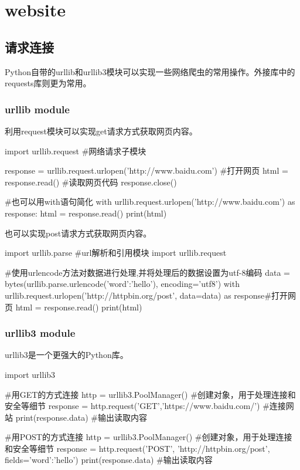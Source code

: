 \section{website}

  \subsection{请求连接}
    Python自带的urllib和urllib3模块可以实现一些网络爬虫的常用操作。外接库中的requests库则更为常用。
    \subsubsection{urllib module}
      利用request模块可以实现get请求方式获取网页内容。
      \begin{codeblock}[language=python, caption={Fetch web content using GET method}]
        import urllib.request #网络请求子模块

        response = urllib.request.urlopen('http://www.baidu.com') #打开网页
        html = response.read() #读取网页代码
        response.close()

        #也可以用with语句简化
        with urllib.request.urlopen('http://www.baidu.com') as response:
            html = response.read()
        print(html)
      \end{codeblock}

      也可以实现post请求方式获取网页内容。
      \begin{codeblock}[language=python, caption={Fetch web content using POST method}]
        import urllib.parse #url解析和引用模块
        import urllib.request

        #使用urlencode方法对数据进行处理,并将处理后的数据设置为utf-8编码
        data = bytes(urllib.parse.urlencode({'word':'hello'}), encoding='utf8')
        with urllib.request.urlopen('http://httpbin.org/post', data=data) as response#打开网页
            html = response.read()
        print(html)
      \end{codeblock}

    \subsubsection{urllib3 module}
      urllib3是一个更强大的Python库。
      \begin{codeblock}[language=python, caption={urllib3 module}]
        import urllib3

        #用GET的方式连接
        http = urllib3.PoolManager() #创建对象，用于处理连接和安全等细节
        response = http.request('GET','https://www.baidu.com/') #连接网站
        print(response.data) #输出读取内容

        #用POST的方式连接
        http = urllib3.PoolManager() #创建对象，用于处理连接和安全等细节
        response = http.request('POST', 'http://httpbin.org/post', fields={'word':'hello'})
        print(response.data) #输出读取内容
      \end{codeblock}

